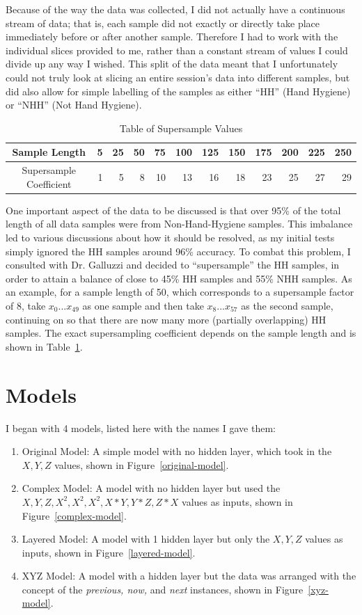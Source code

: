 \documentclass[]{report}
\begin{document}
Because of the way the data was collected, I did not actually have a continuous stream of data; that is, each sample did not exactly or directly take place immediately before or after another sample. Therefore I had to work with the individual slices provided to me, rather than a constant stream of values I could divide up any way I wished. This split of the data meant that I unfortunately could not truly look at slicing an entire session's data into different samples, but did also allow for simple labelling of the samples as either ``HH'' (Hand Hygiene) or ``NHH'' (Not Hand Hygiene).

\begin{table}
	\centering
	\label{supersamples}
	\begin{tabular}{|c|r|r|r|r|r|r|r|r|r|r|r|}
		\hline
		Sample Length          & 5 & 25 & 50 & 75 & 100 & 125 & 150 & 175 & 200 & 225 & 250 \\
		\hline
		Supersample Coefficient & 1 & 5  & 8  & 10 & 13 & 16  & 18  & 23  & 25  & 27  & 29 \\
		\hline
	\end{tabular}
	\caption{Table of Supersample Values}
\end{table}

One important aspect of the data to be discussed is that over 95\% of the total length of all data samples were from Non-Hand-Hygiene samples. This imbalance led to various discussions about how it should be resolved, as my initial tests simply ignored the HH samples around 96\% accuracy. To combat this problem, I consulted with Dr. Galluzzi and decided to ``supersample'' the HH samples, in order to attain a balance of close to 45\% HH samples and 55\% NHH samples. As an example, for a sample length of 50, which corresponds to a supersample factor of 8, take $x_{0} ... x_{49}$ as one sample and then take $x_{8} ... x_{57}$ as the second sample, continuing on so that there are now many more (partially overlapping) HH samples. The exact supersampling coefficient depends on the sample length and is shown in Table~\ref{supersamples}.

\section{Models}\label{models}

I began with 4 models, listed here with the names I gave them:
\begin{enumerate}
	\item Original Model: A simple model with no hidden layer, which took in the $X,Y,Z$ values, shown in Figure~\ref{original-model}.
	\item Complex Model: A model with no hidden layer but used the $X,Y,Z,X^{2},X^{2},X^{2},X*Y,Y*Z,Z*X$ values as inputs, shown in Figure~\ref{complex-model}.
	\item Layered Model: A model with 1 hidden layer but only the $X,Y,Z$ values as inputs, shown in Figure~\ref{layered-model}.
	\item XYZ Model: A model with a hidden layer but the data was arranged with the concept of the \textit{previous, now,} and \textit{next} instances, shown in Figure~\ref{xyz-model}.
\end{enumerate}
\end{document}

